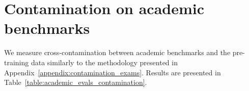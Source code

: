 \documentclass{article}
\begin{document}
\begin{table}[htbp]
{\begin{tabular}[]
\bottomrule
\end{tabular}}
\caption{Contamination data for Exams (Details). Detailed contamination information on each of the exams tested are shown in this table, listed from most-to-least contaminated. Exams with both multiple choice questions (MCQ) and free-response questions (FRQ) are split into separate rows. For each set, we list the number of questions and fraction which are contaminated (appear in the training set). We then report GPT-4's performance (as percentage of max score) on the overall set, on the non-contaminated questions, and on only the contaminated set. The degradation (non-contaminated percent minus contaminated) is generally small and as often positive as negative, from which we conclude that contamination is not a substantive confounder on the overall results.}
\label{table:contam_details}
\end{table}

\section{Contamination on academic benchmarks}
\label{appendix:contamination}

We measure cross-contamination between academic benchmarks and the pre-training data similarly to the methodology presented in Appendix~\ref{appendix:contamination_exams}. Results are presented in Table~\ref{table:academic_evals_contamination}.
\end{document}
